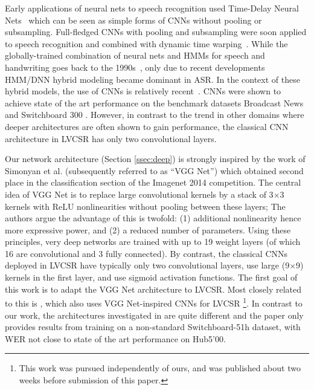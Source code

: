 \documentclass{article}
\begin{document}
Early applications of neural nets to speech recognition used Time-Delay Neural Nets~\cite{waibel1989phoneme} which
can be seen as simple forms of CNNs without pooling or subsampling. Full-fledged CNNs with pooling and
subsampling were soon applied to speech recognition and combined with dynamic time warping~\cite{bottou1989experiments,bottou1990speaker}.
While the globally-trained combination of neural nets and HMMs for speech and handwriting goes back to the 1990s~\cite{bengio1992global,lecun1998gradient},
only due to recent developments \cite{seide2011conversational, mohamed2011deep, kingsbury2009lattice}
HMM/DNN hybrid modeling became dominant in ASR.
In the context of these hybrid models, the use of CNNs is relatively recent~\cite{abdel2012applying}.
CNNs were shown to achieve state of the art performance on the benchmark datasets
Broadcast News and Switchboard 300 \cite{sainath2013deep}.
However, in contrast to the trend in other domains where deeper architectures
are often shown to gain performance,
the classical CNN architecture in LVCSR \cite{sainath2013deep, soltau2014joint, saon2015ibm} 
has only two convolutional layers.

Our network architecture (Section \ref{ssec:deep}) is strongly inspired by the
work of Simonyan et al. \cite{simonyan2014very} (subsequently referred to as ``VGG Net'') which obtained
second place in the classification section of the Imagenet 2014 competition.
The central idea of VGG Net is to replace large convolutional kernels by a stack of 3$\times$3 kernels with ReLU nonlinearities
without pooling between these layers; 
The authors argue the advantage of this is twofold: (1) additional nonlinearity hence more expressive power, and (2) a reduced number of parameters.
Using these principles, very deep networks are trained with up to 19 weight layers (of which 16 are convolutional and 3 fully connected).
By contrast, the classical CNNs deployed in LVCSR have typically only two convolutional layers,
use large (9$\times$9) kernels in the first layer, and use sigmoid activation functions.
The first goal of this work is to adapt the VGG Net architecture to LVCSR.
Most closely related to this is \cite{bi2015very}, which also uses VGG Net-inspired CNNs for LVCSR
\footnote{This work was pursued independently of ours, and was published about two weeks before submission of this paper.}.
In contrast to our work, the architectures investigated in \cite{bi2015very} are quite different
and the paper only provides results from training on a non-standard Switchboard-51h dataset,
with WER not close to state of the art performance on Hub5'00.
\end{document}
